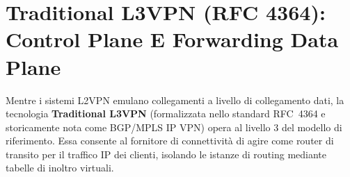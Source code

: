 \documentclass[11pt, a4paper]{article}
\begin{document}

\section{Traditional L3VPN (RFC 4364): Control Plane E Forwarding Data Plane}

Mentre i sistemi L2VPN emulano collegamenti a livello di collegamento dati, la tecnologia \textbf{Traditional L3VPN} (formalizzata nello standard RFC~4364 e storicamente nota come BGP/MPLS IP VPN) opera al livello 3 del modello di riferimento. Essa consente al fornitore di connettività di agire come router di transito per il traffico IP dei clienti, isolando le istanze di routing mediante tabelle di inoltro virtuali.

\end{document}
